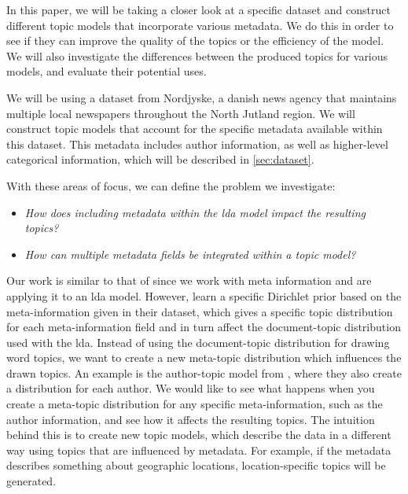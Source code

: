 In this paper, we will be taking a closer look at a specific dataset and construct different topic models that incorporate various metadata.
We do this in order to see if they can improve the quality of the topics or the efficiency of the model.
We will also investigate the differences between the produced topics for various models, and evaluate their potential uses.

We will be using a dataset from Nordjyske, a danish news agency that maintains multiple local newspapers throughout the North Jutland region.
We will construct topic models that account for the specific metadata available within this dataset.
This metadata includes author information, as well as higher-level categorical information, which will be described in \autoref{sec:dataset}.

With these areas of focus, we can define the problem we investigate:

\begin{itemize}
	\item \textit{How does including metadata within the \gls{lda} model impact the resulting topics?}
	\item \textit{How can multiple metadata fields be integrated within a topic model?}
\end{itemize}

Our work is similar to that of \citet{MetaLDA2017} since we work with meta information and are applying it to an \gls{lda} model.
However, \citet{MetaLDA2017} learn a specific Dirichlet prior based on the meta-information given in their dataset, which gives a specific topic distribution for each meta-information field and in turn affect the document-topic distribution used with the \gls{lda}.
Instead of using the document-topic distribution for drawing word topics, we want to create a new meta-topic distribution which influences the drawn topics.
An example is the author-topic model from \citet{author_topic_2012}, where they also create a distribution for each author.
We would like to see what happens when you create a meta-topic distribution for any specific meta-information, such as the author information, and see how it affects the resulting topics.
The intuition behind this is to create new topic models, which describe the data in a different way using topics that are influenced by metadata.
For example, if the metadata describes something about geographic locations, location-specific topics will be generated.


